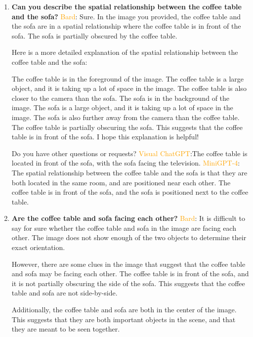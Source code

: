 \begin{enumerate}
    \item \textbf{Can you describe the spatial relationship between the coffee table and the sofa?}
    \subitem \textcolor{orange}{Bard}: 
    Sure. In the image you provided, the coffee table and the sofa are in a spatial relationship where the coffee table is in front of the sofa. The sofa is partially obscured by the coffee table.
    
    Here is a more detailed explanation of the spatial relationship between the coffee table and the sofa:
    
    The coffee table is in the foreground of the image. The coffee table is a large object, and it is taking up a lot of space in the image. The coffee table is also closer to the camera than the sofa.
    The sofa is in the background of the image. The sofa is a large object, and it is taking up a lot of space in the image. The sofa is also further away from the camera than the coffee table.
    The coffee table is partially obscuring the sofa. This suggests that the coffee table is in front of the sofa.
    I hope this explanation is helpful!
    
    Do you have other questions or requests?
    \subitem \textcolor{orange}{Visual ChatGPT}:The coffee table is located in front of the sofa, with the sofa facing the television.
    \subitem \textcolor{orange}{MiniGPT-4}: The spatial relationship between the coffee table and the sofa is that they are both located in the same room, and are positioned near each other. The coffee table is in front of the sofa, and the sofa is positioned next to the coffee table.
    \item \textbf{Are the coffee table and sofa facing each other?}
    \subitem \textcolor{orange}{Bard}: 
    It is difficult to say for sure whether the coffee table and sofa in the image are facing each other. The image does not show enough of the two objects to determine their exact orientation.
    
    However, there are some clues in the image that suggest that the coffee table and sofa may be facing each other. The coffee table is in front of the sofa, and it is not partially obscuring the side of the sofa. This suggests that the coffee table and sofa are not side-by-side.
    
    Additionally, the coffee table and sofa are both in the center of the image. This suggests that they are both important objects in the scene, and that they are meant to be seen together.
    

\end{enumerate}
